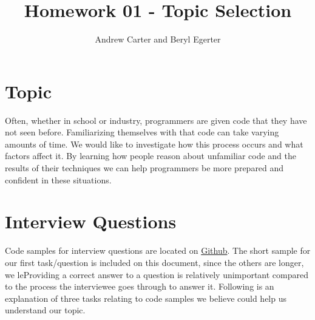 \documentclass{article}
\author{Andrew Carter and Beryl Egerter}
\title{Homework 01 - Topic Selection}
\begin{document}
\maketitle
\section{Topic}
Often, whether in school or industry, programmers are given code that they have not seen before. Familiarizing themselves with that code can take varying amounts of time. We would like to investigate how this process occurs and what factors affect it. By learning how people reason about unfamiliar code and the results of their techniques we can help programmers be more prepared and confident in these situations.
\section{Interview Questions}
Code samples for interview questions are located on \href{https://github.com/calcu16/cs182d}{Github}. The short sample for our first task/question is included on this document, since the others are longer, we leProviding a correct answer to a question is relatively unimportant compared to the process the interviewee goes through to answer it. Following is an explanation of three tasks relating to code samples we believe could help us understand our topic.
\end{document}
